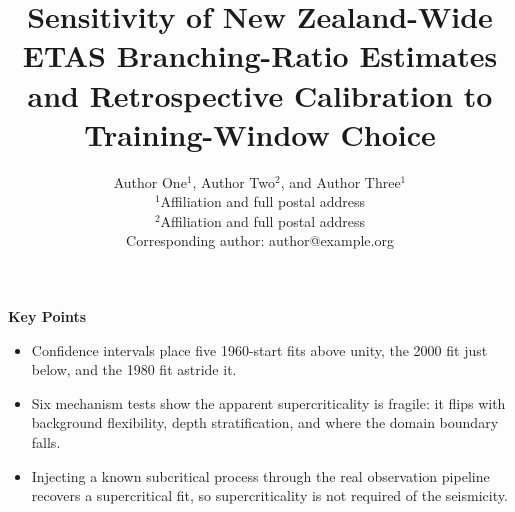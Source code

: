 \documentclass[12pt]{article}
\title{Sensitivity of New Zealand-Wide ETAS Branching-Ratio Estimates and
Retrospective Calibration to Training-Window Choice}
\author{
Author One$^{1}$, Author Two$^{2}$, and Author Three$^{1}$\\
\small $^{1}$Affiliation and full postal address\\
\small $^{2}$Affiliation and full postal address\\
\small Corresponding author: author@example.org
}
\date{}
\begin{document}
\maketitle

\noindent\textbf{Key Points}
\begin{itemize}
\item Confidence intervals place five 1960-start fits above unity, the 2000 fit just below, and the 1980 fit astride it.
\item Six mechanism tests show the apparent supercriticality is fragile: it flips with background flexibility, depth stratification, and where the domain boundary falls.
\item Injecting a known subcritical process through the real observation pipeline recovers a supercritical fit, so supercriticality is not required of the seismicity.
\end{itemize}
\end{document}
